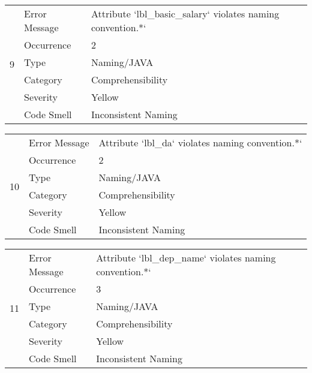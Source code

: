 \documentclass[12pt,english]{article}
\begin{document}
\begin{table}[!ht]
    \begin{tabularx}{\textwidth}{|c|l|X|}
    \hline
        \multirow{6}{*}{9} & Error Message & Attribute `lbl\_basic\_salary` violates naming convention.*` \\ \cline{2-3}
        & Occurrence & 2 \\ \cline{2-3}
        & Type & Naming/JAVA \\ \cline{2-3}
        & Category & Comprehensibility \\ \cline{2-3}
        & Severity & Yellow \\ \cline{2-3}
        & Code Smell & Inconsistent Naming \\ \hline
    \end{tabularx}
\end{table}

\begin{table}[!ht]
    \begin{tabularx}{\textwidth}{|c|l|X|}
    \hline
        \multirow{6}{*}{10} & Error Message & Attribute `lbl\_da` violates naming convention.*` \\ \cline{2-3}
        & Occurrence & 2 \\ \cline{2-3}
        & Type & Naming/JAVA \\ \cline{2-3}
        & Category & Comprehensibility \\ \cline{2-3}
        & Severity & Yellow \\ \cline{2-3}
        & Code Smell & Inconsistent Naming \\ \hline
    \end{tabularx}
\end{table}

\begin{table}[!ht]
    \begin{tabularx}{\textwidth}{|c|l|X|}
    \hline
        \multirow{6}{*}{11} & Error Message & Attribute `lbl\_dep\_name` violates naming convention.*` \\ \cline{2-3}
        & Occurrence & 3 \\ \cline{2-3}
        & Type & Naming/JAVA \\ \cline{2-3}
        & Category & Comprehensibility \\ \cline{2-3}
        & Severity & Yellow \\ \cline{2-3}
        & Code Smell & Inconsistent Naming \\ \hline
    \end{tabularx}
\end{table}
\end{document}
